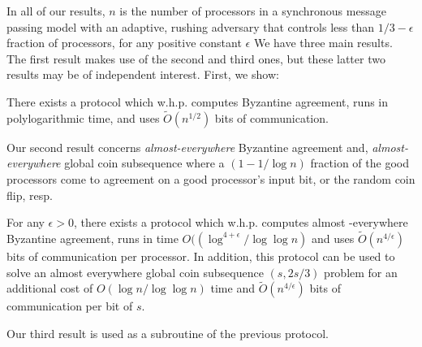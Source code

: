 \documentclass{sig-alternate}
\begin{document}
In all of our results, $n$ is the number of processors in a synchronous message passing model with an adaptive, rushing adversary that controls less than $1/3- \epsilon$ fraction of processors, for any positive constant $\epsilon$  We have three main results.  The first result makes use of the second and third ones, but these latter two results may be of independent interest. First, we show:

\begin{theorem} \label{t:main} {}
There exists a protocol which w.h.p. computes Byzantine agreement, runs in polylogarithmic time,  and uses $\tilde{O}(n^{1/2})$ bits of communication.
\end{theorem}

Our second result concerns \emph{almost-everywhere} Byzantine agreement and,  \emph{almost-everywhere} global coin subsequence where a $(1-1/\log n)$ fraction of the good processors come to agreement on a good processor's input bit, or the random coin flip, resp.

\begin{theorem} \label{t:ae} {}
For any $\epsilon >0$, there exists a protocol which w.h.p. computes almost -everywhere Byzantine agreement, runs in time $O((\log^{4+\epsilon}/\log \log n)$ and uses $\tilde{O}(n^{4/\epsilon})$ bits of communication per processor. In addition, this protocol can be used to solve an almost everywhere global coin subsequence $(s,2s/3) $ problem for an additional cost of $O(\log n/\log \log n)$ time and $\tilde{O}(n^{4/\epsilon})$ bits of communication per bit of $s$.   
\end{theorem}

Our third result is used as a subroutine of the previous protocol. 
\end{document}
